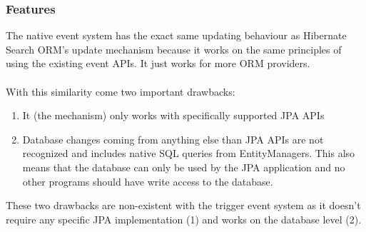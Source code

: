 \subsubsection{Features}
The native event system has the exact same updating behaviour as Hibernate Search ORM's update mechanism because it works on the same principles of using the existing event APIs. It just works for more ORM providers.
\\\\
With this similarity come two important drawbacks:
\begin{enumerate}
	\item It (the mechanism) only works with specifically supported JPA APIs
	\item Database changes coming from anything else than JPA APIs are not recognized and includes native SQL queries from EntityManagers. This also means that the database can only be used by the JPA application and no other programs should have write access to the database.
\end{enumerate}
\noindent
These two drawbacks are non-existent with the trigger event system as it doesn't require any specific JPA implementation (1) and works on the database level (2).

\pagebreak

